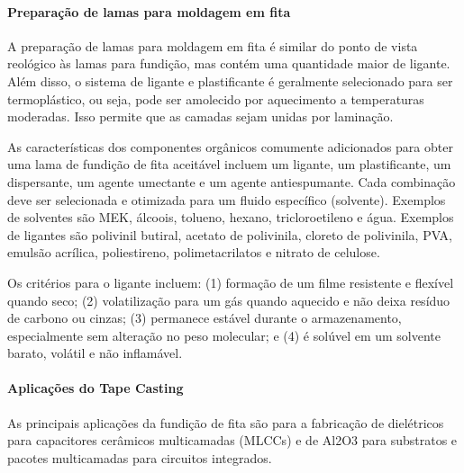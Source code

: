 \paragraph*{Preparação de lamas para moldagem em fita}

A preparação de lamas para moldagem em fita é similar do ponto de vista reológico às lamas para fundição, mas contém uma quantidade maior de ligante. Além disso, o sistema de ligante e plastificante é geralmente selecionado para ser termoplástico, ou seja, pode ser amolecido por aquecimento a temperaturas moderadas. Isso permite que as camadas sejam unidas por laminação.

As características dos componentes orgânicos comumente adicionados para obter uma lama de fundição de fita aceitável incluem um ligante, um plastificante, um dispersante, um agente umectante e um agente antiespumante. Cada combinação deve ser selecionada e otimizada para um fluido específico (solvente). Exemplos de solventes são MEK, álcoois, tolueno, hexano, tricloroetileno e água. Exemplos de ligantes são polivinil butiral, acetato de polivinila, cloreto de polivinila, PVA, emulsão acrílica, poliestireno, polimetacrilatos e nitrato de celulose.

Os critérios para o ligante incluem: (1) formação de um filme resistente e flexível quando seco; (2) volatilização para um gás quando aquecido e não deixa resíduo de carbono ou cinzas; (3) permanece estável durante o armazenamento, especialmente sem alteração no peso molecular; e (4) é solúvel em um solvente barato, volátil e não inflamável.

\paragraph*{Aplicações do Tape Casting}

As principais aplicações da fundição de fita são para a fabricação de dielétricos para capacitores cerâmicos multicamadas (MLCCs) e de Al2O3 para substratos e pacotes multicamadas para circuitos integrados.


